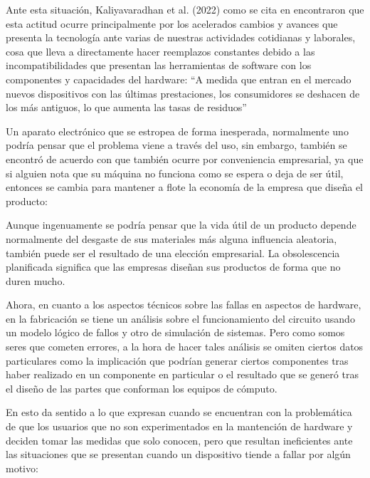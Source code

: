 Ante esta situación, Kaliyavaradhan et al. (2022) como se cita en
\textcite{Seif2024} encontraron que esta actitud ocurre principalmente por los
acelerados cambios y avances que presenta la tecnología ante varias de nuestras
actividades cotidianas y laborales, cosa que lleva a directamente hacer
reemplazos constantes debido a las incompatibilidades que presentan las
herramientas de software con los componentes y capacidades del hardware: ``A
medida que entran en el mercado nuevos dispositivos con las últimas
prestaciones, los consumidores se deshacen de los más antiguos, lo que aumenta
las tasas de residuos''

Un aparato electrónico que se estropea de forma inesperada, normalmente uno
podría pensar que el problema viene a través del uso, sin embargo, también se
encontró de acuerdo con \textcite{Hartl2023} que también ocurre por
conveniencia empresarial, ya que si alguien nota que su máquina no funciona
como se espera o deja de ser útil, entonces se cambia para mantener a flote la
economía de la empresa que diseña el producto:

\begin{displayquote}
  Aunque ingenuamente se podría pensar que la vida útil de un producto depende
  normalmente del desgaste de sus materiales más alguna influencia aleatoria,
  también puede ser el resultado de una elección empresarial. La obsolescencia
  planificada significa que las empresas diseñan sus productos de forma que no
  duren mucho.
\end{displayquote}

Ahora, en cuanto a los aspectos técnicos sobre las fallas en aspectos de
hardware, en la fabricación se tiene un análisis sobre el funcionamiento del
circuito usando un modelo lógico de fallos y otro de simulación de sistemas. Pero
como somos seres que cometen errores, a la hora de hacer tales análisis se
omiten ciertos datos particulares como la implicación que podrían generar
ciertos componentes tras haber realizado en un componente en particular o el
resultado que se generó tras el diseño de las partes que conforman los equipos
de cómputo. \parencite{Jin2023}

En esto da sentido a lo que expresan \textcite{Zailani2021} cuando se
encuentran con la problemática de que los usuarios que no son experimentados en
la mantención de hardware y deciden tomar las medidas que solo conocen, pero
que resultan ineficientes ante las situaciones que se presentan cuando un
dispositivo tiende a fallar por algún motivo: 

